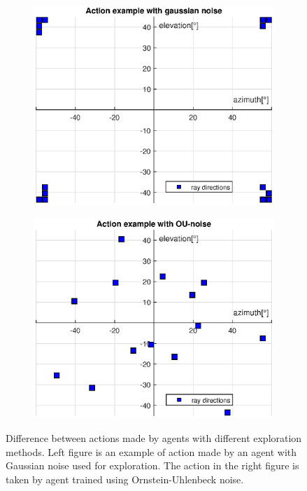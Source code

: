 \begin{figure}[H]
\begin{subfigure}[h]{0.5\linewidth}
\includegraphics[width=\linewidth]{fig/wrong_action.eps}
\end{subfigure}
\hfill
\begin{subfigure}[h]{0.5\linewidth}
\includegraphics[width=\linewidth]{fig/right_action.eps}
\end{subfigure}
\captionsetup{width=1\textwidth}
\caption[Difference between exploration methods]{Difference between actions made by agents with different exploration methods. Left figure is an example of action made by an agent with Gaussian noise used for exploration. The action in the right figure is taken by agent trained using Ornstein-Uhlenbeck noise.}
\label{fig:expdiff}
\end{figure}

